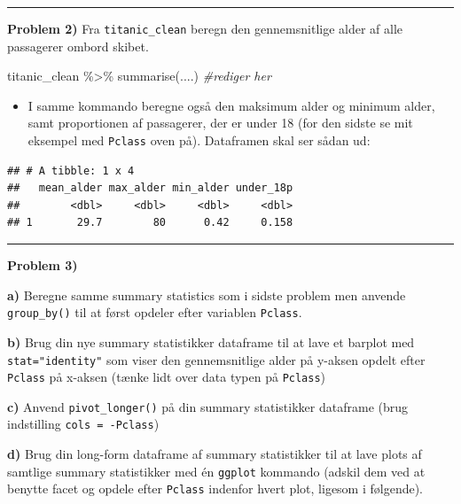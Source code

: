 \documentclass[
]{book}
\newenvironment{Shaded}{\begin{snugshade}}{\end{snugshade}}
\newcommand{\CommentTok}[1]{\textcolor[rgb]{0.56,0.35,0.01}{\textit{#1}}}
\newcommand{\FunctionTok}[1]{\textcolor[rgb]{0.00,0.00,0.00}{#1}}
\newcommand{\NormalTok}[1]{#1}
\newcommand{\SpecialCharTok}[1]{\textcolor[rgb]{0.00,0.00,0.00}{#1}}
\providecommand{\tightlist}{%
  \setlength{\itemsep}{0pt}\setlength{\parskip}{0pt}}
\begin{document}
\begin{center}\rule{0.5\linewidth}{0.5pt}\end{center}

\textbf{Problem 2)} Fra \texttt{titanic\_clean} beregn den gennemsnitlige alder af alle passagerer ombord skibet.

\begin{Shaded}
\begin{Highlighting}[]
\NormalTok{titanic\_clean }\SpecialCharTok{\%\textgreater{}\%}
    \FunctionTok{summarise}\NormalTok{(....) }\CommentTok{\#rediger her}
\end{Highlighting}
\end{Shaded}

\begin{itemize}
\tightlist
\item
  I samme kommando beregne også den maksimum alder og minimum alder, samt proportionen af passagerer, der er under 18 (for den sidste se mit eksempel med \texttt{Pclass} oven på). Dataframen skal ser sådan ud:
\end{itemize}

\begin{verbatim}
## # A tibble: 1 x 4
##   mean_alder max_alder min_alder under_18p
##        <dbl>     <dbl>     <dbl>     <dbl>
## 1       29.7        80      0.42     0.158
\end{verbatim}

\begin{center}\rule{0.5\linewidth}{0.5pt}\end{center}

\textbf{Problem 3)}

\textbf{a)} Beregne samme summary statistics som i sidste problem men anvende \texttt{group\_by()} til at først opdeler efter variablen \texttt{Pclass}.

\textbf{b)} Brug din nye summary statistikker dataframe til at lave et barplot med \texttt{stat="identity"} som viser den gennemsnitlige alder på y-aksen opdelt efter \texttt{Pclass} på x-aksen (tænke lidt over data typen på \texttt{Pclass})

\textbf{c)} Anvend \texttt{pivot\_longer()} på din summary statistikker dataframe (brug indstilling \texttt{cols\ =\ -Pclass})

\textbf{d)} Brug din long-form dataframe af summary statistikker til at lave plots af samtlige summary statistikker med én \texttt{ggplot} kommando (adskil dem ved at benytte facet og opdele efter \texttt{Pclass} indenfor hvert plot, ligesom i følgende).
\end{document}
